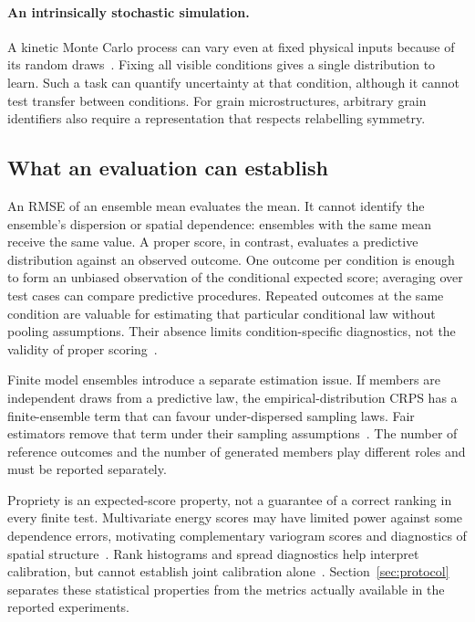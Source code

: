 \paragraph{An intrinsically stochastic simulation.}
A kinetic Monte Carlo process can vary even at fixed physical inputs because
of its random draws~\cite{plimpton2009spparks}. Fixing all visible conditions
gives a single distribution to learn. Such a task can quantify uncertainty at
that condition, although it cannot test transfer between conditions. For grain
microstructures, arbitrary grain identifiers also require a representation
that respects relabelling symmetry.

\subsection{What an evaluation can establish}
\label{sec:intro:measurement}

An RMSE of an ensemble mean evaluates the mean. It cannot identify the
ensemble's dispersion or spatial dependence: ensembles with the same mean
receive the same value. A proper score, in contrast, evaluates a predictive
distribution against an observed outcome. One outcome per condition is enough
to form an unbiased observation of the conditional expected score; averaging
over test cases can compare predictive procedures. Repeated outcomes at the
same condition are valuable for estimating that particular conditional law
without pooling assumptions. Their absence limits condition-specific
diagnostics, not the validity of proper scoring~\cite{gneiting2007strictly}.

Finite model ensembles introduce a separate estimation issue. If members are
independent draws from a predictive law, the empirical-distribution CRPS has a
finite-ensemble term that can favour under-dispersed sampling laws. Fair
estimators remove that term under their sampling
assumptions~\cite{ferro2014fair,zamo2018estimation}. The number of reference
outcomes and the number of generated members play different roles and must be
reported separately.

Propriety is an expected-score property, not a guarantee of a correct ranking
in every finite test. Multivariate energy scores may have limited power against
some dependence errors, motivating complementary variogram scores and
diagnostics of spatial structure~\cite{pinson2013discrimination,
scheuerer2015variogram,marcotte2023regions}. Rank histograms and spread
diagnostics help interpret calibration, but cannot establish joint calibration
alone~\cite{hamill2001interpretation}. Section~\ref{sec:protocol} separates
these statistical properties from the metrics actually available in the
reported experiments.

